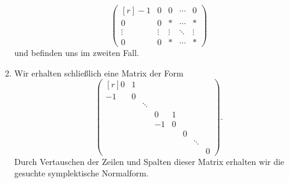 \begin{enumerate}
\[\begin{pmatrix*}[r]
        -1      & 0       & 0       & \cdots  & 0       \\
         0      & 0       & *       & \cdots  & *       \\
         \vdots & \vdots  & \vdots  & \ddots  & \vdots  \\
         0      & 0       & *       & \cdots  & *
      \end{pmatrix*}
    \]
    und befinden uns im zweiten Fall.
  \item
    Wir erhalten schließlich eine Matrix der Form
    \[
      \begin{pmatrix*}[r]
         0  & 1 &         &     &   &   &         &   \\
        -1  & 0 &         &     &   &   &         &   \\
            &   & \ddots  &     &   &   &         &   \\
            &   &         &  0  & 1 &   &         &   \\
            &   &         & -1  & 0 &   &         &   \\
            &   &         &     &   & 0 &         &   \\
            &   &         &     &   &   & \ddots  &   \\
            &   &         &     &   &   &         & 0
      \end{pmatrix*}.
    \]
    Durch Vertauschen der Zeilen und Spalten dieser Matrix erhalten wir die gesuchte symplektische Normalform.
\end{enumerate}




\addtocounter{subsection}{-2}
\subsection{}

